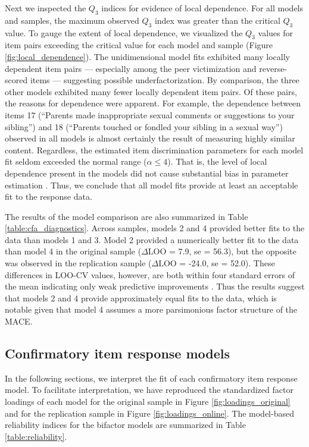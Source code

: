 \documentclass[letterpaper,man,natbib,floatsintext,longtable]{apa6}
\begin{document}
Next we inspected the $Q_3$ indices for evidence of local dependence. For all models and samples, the maximum observed $Q_3$ index was greater than the critical $Q_3$ value. To gauge the extent of local dependence, we visualized the $Q_3$ values for item pairs exceeding the critical value for each model and sample (Figure \ref{fig:local_dependence}). The unidimensional model fits exhibited many locally dependent item pairs --- especially among the peer victimization and reverse-scored items --- suggesting possible underfactorization. By comparison, the three other models exhibited many fewer locally dependent item pairs. Of these pairs, the reasons for dependence were apparent. For example, the dependence between items 17 (``Parents made inappropriate sexual comments or suggestions to your sibling'') and 18 (``Parents touched or fondled your sibling in a sexual way'') observed in all models is almost certainly the result of measuring highly similar content. Regardless, the estimated item discrimination parameters for each model fit seldom exceeded the normal range ($\alpha \leq 4$). That is, the level of local dependence present in the models did not cause substantial bias in parameter estimation \citep{edwards2018diagnostic}. Thus, we conclude that all model fits provide at least an acceptable fit to the response data.

The results of the model comparison are also summarized in Table \ref{table:cfa_diagnostics}. Across samples, models 2 and 4 provided better fits to the data than models 1 and 3. Model 2 provided a numerically better fit to the data than model 4 in the original sample ($\Delta \text{LOO}$ = 7.9, se = 56.3), but the opposite was observed in the replication sample ($\Delta \text{LOO}$ = -24.0, se = 52.0). These differences in LOO-CV values, however, are both within four standard errors of the mean indicating only weak predictive improvements \citep{vehtari2022cv}. Thus the results suggest that models 2 and 4 provide approximately equal fits to the data, which is notable given that model 4 assumes a more parsimonious factor structure of the MACE.

\subsection{Confirmatory item response models}

In the following sections, we interpret the fit of each confirmatory item response model. To facilitate interpretation, we have reproduced the standardized factor loadings of each model for the original sample in Figure \ref{fig:loadings_original} and for the replication sample in Figure \ref{fig:loadings_online}. The model-based reliability indices for the bifactor models are summarized in Table \ref{table:reliability}. 
\end{document}
